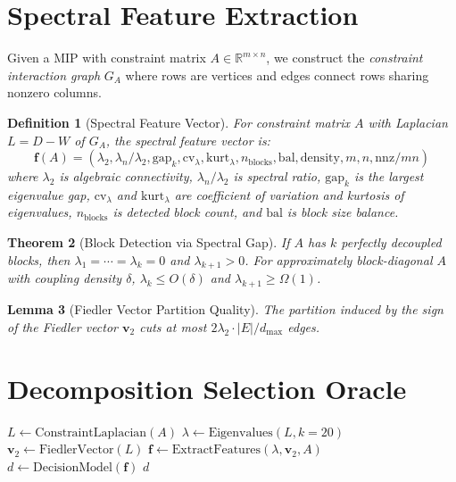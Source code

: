 \documentclass[11pt]{article}
\newtheorem{theorem}{Theorem}
\newtheorem{definition}[theorem]{Definition}
\newtheorem{lemma}[theorem]{Lemma}
\begin{document}
\section{Spectral Feature Extraction}
\label{sec:features}

Given a MIP with constraint matrix $A \in \mathbb{R}^{m \times n}$, we construct the \emph{constraint interaction graph} $G_A$ where rows are vertices and edges connect rows sharing nonzero columns.

\begin{definition}[Spectral Feature Vector]
For constraint matrix $A$ with Laplacian $L = D - W$ of $G_A$, the spectral feature vector is:
$$\mathbf{f}(A) = (\lambda_2, \lambda_n/\lambda_2, \mathrm{gap}_k, \mathrm{cv}_\lambda, \mathrm{kurt}_\lambda, n_{\mathrm{blocks}}, \mathrm{bal}, \mathrm{density}, m, n, \mathrm{nnz}/mn)$$
where $\lambda_2$ is algebraic connectivity, $\lambda_n/\lambda_2$ is spectral ratio, $\mathrm{gap}_k$ is the largest eigenvalue gap, $\mathrm{cv}_\lambda$ and $\mathrm{kurt}_\lambda$ are coefficient of variation and kurtosis of eigenvalues, $n_{\mathrm{blocks}}$ is detected block count, and $\mathrm{bal}$ is block size balance.
\end{definition}

\begin{theorem}[Block Detection via Spectral Gap]
\label{thm:gap}
If $A$ has $k$ perfectly decoupled blocks, then $\lambda_1 = \cdots = \lambda_k = 0$ and $\lambda_{k+1} > 0$. For approximately block-diagonal $A$ with coupling density $\delta$, $\lambda_k \leq O(\delta)$ and $\lambda_{k+1} \geq \Omega(1)$.
\end{theorem}

\begin{lemma}[Fiedler Vector Partition Quality]
\label{lem:fiedler}
The partition induced by the sign of the Fiedler vector $\mathbf{v}_2$ cuts at most $2\lambda_2 \cdot |E|/ d_{\max}$ edges.
\end{lemma}

\section{Decomposition Selection Oracle}
\label{sec:oracle}

\begin{algorithm}[t]
\SetAlgoLined
{}
$L \leftarrow \text{ConstraintLaplacian}(A)$\;
$\lambda \leftarrow \text{Eigenvalues}(L, k=20)$\;
$\mathbf{v}_2 \leftarrow \text{FiedlerVector}(L)$\;
$\mathbf{f} \leftarrow \text{ExtractFeatures}(\lambda, \mathbf{v}_2, A)$\;
$d \leftarrow \text{DecisionModel}(\mathbf{f})$\;
\Return $d$\;
\caption{SpecOracle Selection Algorithm}
\end{algorithm}
\end{document}
